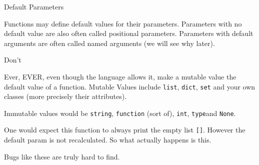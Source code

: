 \begin{frame}[fragile]{Default Parameters}

Functions may define default values for their parameters. Parameters
with no default value are also often called positional parameters.
Parameters with default arguments are often called named arguments (we
will see why later).

\begin{Shaded}
\begin{Highlighting}[]
 \NormalTok{):}
     

\NormalTok{)  }
\NormalTok{, }\NormalTok{)  }
\end{Highlighting}
\end{Shaded}

\end{frame}

\begin{frame}[fragile]

\begin{block}{Don't}

Ever, EVER, even though the language allows it, make a mutable value the
default value of a function. Mutable Values include \texttt{list},
\texttt{dict}, \texttt{set} and your own classes (more precisely their
attributes).

Immutable values would be \texttt{string}, \texttt{function} (sort of),
\texttt{int}, \texttt{type}and \texttt{None}.

\begin{Shaded}
\begin{Highlighting}[]
 
\end{Highlighting}
\end{Shaded}

\end{block}

\end{frame}

\begin{frame}[fragile]

One would expect this function to always print the empty list
\texttt{{[}{]}}. However the default param is not recalculated. So what
actually happens is this.

\begin{Shaded}
\begin{Highlighting}[]
\NormalTok{)  }\CommentTok{# ==> []}
\NormalTok{)  }\CommentTok{# ==> [1]}
\NormalTok{) }\CommentTok{# ==> [1,2]}
\end{Highlighting}
\end{Shaded}

Bugs like these are truly hard to find.

\end{frame}

